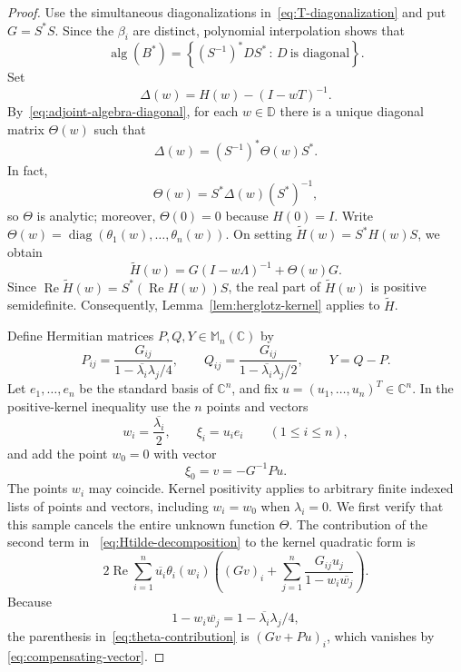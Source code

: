 \documentclass[preprints,article,submit,oneauthor]{Definitions/mdpi}
\theoremstyle{mdpi}
\theoremstyle{definition}
\newcommand{\C}{\mathbb C}
\newcommand{\D}{\mathbb D}
\newcommand{\Mn}{\mathbb M_n(\C)}
\newcommand{\alg}{\operatorname{alg}}
\newcommand{\RePart}{\operatorname{Re}}
\newcommand{\diag}{\operatorname{diag}}
\begin{document}
\begin{proof}
Use the simultaneous diagonalizations in~\eqref{eq:T-diagonalization}
and put $G=S^*S$.  Since the $\beta_i$ are distinct, polynomial
interpolation shows that
\begin{equation}
  \alg(B^*)
  =\left\{(S^{-1})^* D S^* \,:\,
  D\ \text{is diagonal}\right\}.
  \label{eq:adjoint-algebra-diagonal}
\end{equation}
Set
\[
  \Delta(w)=H(w)-(I-wT)^{-1}.
\]
By~\eqref{eq:adjoint-algebra-diagonal}, for each $w\in\D$ there is a
unique diagonal matrix $\Theta(w)$ such that
\[
  \Delta(w)=(S^{-1})^*\Theta(w)S^*.
\]
In fact,
\[
  \Theta(w)=S^*\Delta(w)(S^*)^{-1},
\]
so $\Theta$ is analytic; moreover, $\Theta(0)=0$ because $H(0)=I$.
Write $\Theta(w)=\diag(\theta_1(w),\ldots,\theta_n(w))$.  On setting
$\widetilde H(w)=S^*H(w)S$, we obtain
\begin{equation}
  \widetilde H(w)=G(I-w\Lambda)^{-1}+\Theta(w)G.
  \label{eq:Htilde-decomposition}
\end{equation}
Since $\RePart\widetilde H(w)=S^*(\RePart H(w))S$, the real part of
$\widetilde H(w)$ is positive semidefinite.  Consequently,
Lemma~\ref{lem:herglotz-kernel} applies to $\widetilde H$.

Define Hermitian matrices $P,Q,Y\in\Mn$ by
\begin{equation}
  P_{ij}=\frac{G_{ij}}{1-\overline{\lambda_i}\lambda_j/4},
  \qquad
  Q_{ij}=\frac{G_{ij}}{1-\overline{\lambda_i}\lambda_j/2},
  \qquad
  Y=Q-P.
  \label{eq:PQY-definition}
\end{equation}
Let $e_1,\ldots,e_n$ be the standard basis of $\C^n$, and fix
$u=(u_1,\ldots,u_n)^T\in\C^n$.  In the positive-kernel inequality use
the $n$ points and vectors
\begin{equation}
  w_i=\frac{\overline{\lambda_i}}2,\qquad
  \xi_i=u_i e_i\qquad(1\leq i\leq n),
  \label{eq:eigenvalue-samples}
\end{equation}
and add the point $w_0=0$ with vector
\begin{equation}
  \xi_0=v=-G^{-1}Pu.
  \label{eq:compensating-vector}
\end{equation}
The points $w_i$ may coincide.  Kernel positivity applies to arbitrary
finite indexed lists of points and vectors, including $w_i=w_0$ when
$\lambda_i=0$.
We first verify that this sample cancels the entire unknown function
$\Theta$.  The contribution of the second term in~%
\eqref{eq:Htilde-decomposition} to the kernel quadratic form is
\begin{equation}
  2\RePart\sum_{i=1}^n
  \overline{u_i}\theta_i(w_i)
  \left(
    (Gv)_i+
    \sum_{j=1}^n
    \frac{G_{ij}u_j}{1-w_i\overline{w_j}}
  \right).
  \label{eq:theta-contribution}
\end{equation}
Because
\[
  1-w_i\overline{w_j}
  =1-\overline{\lambda_i}\lambda_j/4,
\]
the parenthesis in~\eqref{eq:theta-contribution} is
$(Gv+Pu)_i$, which vanishes by~%
\eqref{eq:compensating-vector}.


\end{proof}
\end{document}
